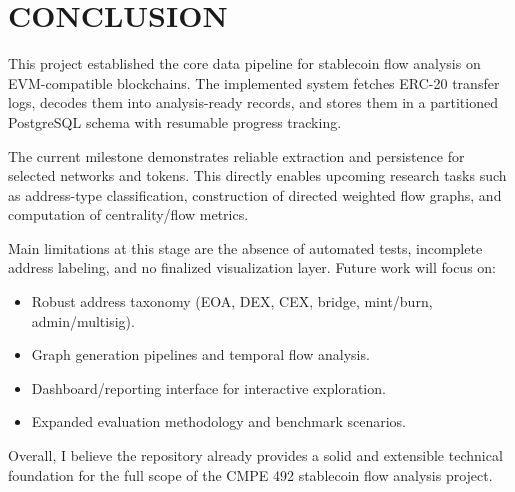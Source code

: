 \documentclass[a4paper,12pt]{report}
\begin{document}
\chapter{CONCLUSION}
This project established the core data pipeline for stablecoin flow analysis on EVM-compatible
blockchains. The implemented system fetches ERC-20 transfer logs, decodes them into analysis-ready
records, and stores them in a partitioned PostgreSQL schema with resumable progress tracking.

The current milestone demonstrates reliable extraction and persistence for selected networks and
tokens. This directly enables upcoming research tasks such as address-type classification,
construction of directed weighted flow graphs, and computation of centrality/flow metrics.

Main limitations at this stage are the absence of automated tests, incomplete address labeling, and
no finalized visualization layer. Future work will focus on:
\begin{itemize}
\item Robust address taxonomy (EOA, DEX, CEX, bridge, mint/burn, admin/multisig).
\item Graph generation pipelines and temporal flow analysis.
\item Dashboard/reporting interface for interactive exploration.
\item Expanded evaluation methodology and benchmark scenarios.
\end{itemize}

Overall, I believe the repository already provides a solid and extensible technical foundation for the full
scope of the CMPE 492 stablecoin flow analysis project.

  

\end{document}
